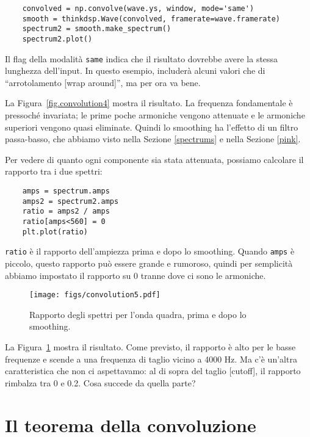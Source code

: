\documentclass[12pt]{book} \usepackage[width=5.5in,height=8.5in, hmarginratio=3:2,vmarginratio=1:1]{geometry}
\begin{document}
\begin{verbatim} 
    convolved = np.convolve(wave.ys, window, mode='same')
    smooth = thinkdsp.Wave(convolved, framerate=wave.framerate)
    spectrum2 = smooth.make_spectrum()
    spectrum2.plot()
 \end{verbatim} 

Il flag della modalità {\tt same} indica che il risultato dovrebbe avere la stessa lunghezza dell'input. In questo esempio, includerà alcuni valori che di ``arrotolamento [wrap around]'', ma per ora va bene.

La Figura~\ref{fig.convolution4} mostra il risultato. La frequenza fondamentale è pressoché invariata; le prime poche armoniche vengono attenuate e le armoniche superiori vengono quasi eliminate. Quindi lo smoothing ha l'effetto di un filtro passa-basso, che abbiamo visto nella Sezione \ref{spectrums} e nella Sezione \ref{pink}.

Per vedere di quanto ogni componente sia stata attenuata, possiamo calcolare il rapporto tra i due spettri:

\begin{verbatim} 
    amps = spectrum.amps
    amps2 = spectrum2.amps
    ratio = amps2 / amps
    ratio[amps<560] = 0
    plt.plot(ratio)
 \end{verbatim} 

{\tt ratio} è il rapporto dell'ampiezza prima e dopo lo smoothing. Quando {\tt amps} è piccolo, questo rapporto può essere grande e rumoroso, quindi per semplicità abbiamo impostato il rapporto su 0 tranne dove ci sono le armoniche.

\begin{figure} 

\centerline{\texttt{[image: figs/convolution5.pdf]}} \caption{Rapporto degli spettri per l'onda quadra, prima e dopo lo smoothing.} \label{fig.convolution5} \end{figure} 

La Figura~\ref{fig.convolution5} mostra il risultato. Come previsto, il rapporto è alto per le basse frequenze e scende a una frequenza di taglio vicino a 4000 Hz. Ma c'è un'altra caratteristica che non ci aspettavamo: al di sopra del taglio [cutoff], il rapporto rimbalza tra 0 e 0.2. Cosa succede da quella parte?

\section{Il teorema della convoluzione} \label{convtheorem} 
\end{document}
